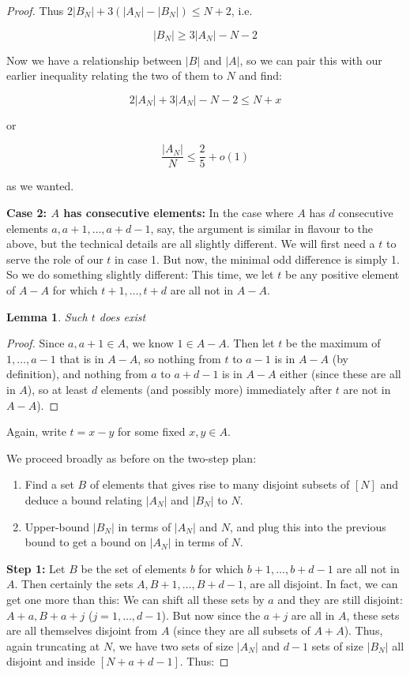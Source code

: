 \documentclass{report}
\newtheorem{lemma}[theorem]{Lemma}
\theoremstyle{remark}
\numberwithin{equation}{section}
\begin{document}
\begin{proof}
Thus $2|B_N| + 3(|A_N| - |B_N|) \leq N+2$, i.e.

\[|B_N| \geq 3|A_N| - N - 2\]

Now we have a relationship between $|B|$ and $|A|$, so we can pair
this with our earlier inequality relating the two of them to $N$ and
find:

\[2|A_N| + 3|A_N| - N - 2 \leq N+x \]

or
 
\[\frac{|A_N|}{N} \leq \frac25+o(1) \]

as we wanted.

\textbf{Case 2: $A$ has consecutive elements:} In the case where $A$
has $d$ consecutive elements $a, a+1, \ldots, a+d-1$, say, the
argument is similar in flavour to the above, but the technical details
are all slightly different.  We will first need a $t$ to serve the
role of our $t$ in case 1.  But now, the minimal odd difference is
simply 1.  So we do something slightly different: This time, we let
$t$ be any positive element of $A-A$ for which $t+1, \ldots, t+d$ are
all not in $A-A$.  

\begin{lemma}Such $t$ does exist\end{lemma}

\begin{proof}Since $a, a+1 \in A$, we know $1 \in A-A$.  Then let $t$
  be the maximum of $1, \ldots, a-1$ that is in $A-A$, so nothing from
  $t$ to $a-1$ is in $A-A$ (by definition), and nothing from $a$ to
  $a+d-1$ is in $A-A$ either (since these are all in $A$), so at least
  $d$ elements (and possibly more) immediately after $t$ are not in
  $A-A$).
\end{proof}

Again, write $t = x-y$ for some fixed $x, y \in A$.

We proceed broadly as before on the two-step plan: 

\begin{enumerate}
\item Find a set $B$ of elements that gives rise to many disjoint
  subsets of $[N]$ and deduce a bound relating $|A_N|$ and $|B_N|$ to
  $N$.
\item Upper-bound $|B_N|$ in terms of $|A_N|$ and $N$, and plug this
  into the previous bound to get a bound on $|A_N|$ in terms of $N$.
\end{enumerate}

\textbf{Step 1: }Let $B$ be the set of elements $b$ for which
$b+1, \ldots, b+d-1$ are all not in $A$.  Then certainly the sets
$A, B+1, \ldots, B+d-1$, are all disjoint.  In fact, we can get one
more than this: We can shift all these sets by $a$ and they are still
disjoint: $A+a, B+a+j$ ($j=1, \ldots, d-1$).  But now since the $a+j$
are all in $A$, these sets are all themselves disjoint from $A$ (since
they are all subsets of $A+A$).  Thus, again truncating at $N$, we
have two sets of size $|A_N|$ and $d-1$ sets of size $|B_N|$ all
disjoint and inside $[N+a+d-1]$.  Thus:


\end{proof}
\end{document}
